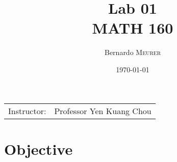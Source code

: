 \documentclass{article}
\title{Lab 01\\ MATH 160} %
\author{Bernardo \textsc{Meurer}} %
\date{\today} %
\begin{document}
    
    \maketitle %
    
    \begin{center}
    \begin{tabular}{l r}
    Instructor: & Professor Yen Kuang Chou %
    \end{tabular}
    \end{center}
    
    
    
    \section{Objective}
    
    
    
    
\end{document}
